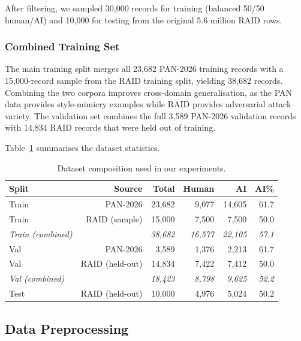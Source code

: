 After filtering, we sampled 30,000 records for training (balanced 50/50 human/AI) and 10,000 for testing from the original 5.6 million RAID rows.

\subsubsection{Combined Training Set}
The main training split merges all 23,682 PAN-2026 training records with a 15,000-record sample from the RAID training split, yielding 38,682 records. Combining the two corpora improves cross-domain generalisation, as the PAN data provides style-mimicry examples while RAID provides adversarial attack variety. The validation set combines the full 3,589 PAN-2026 validation records with 14,834 RAID records that were held out of training.

Table~\ref{tab:datasets} summarises the dataset statistics.

\begin{table}[htbp]
  \centering
  \caption{Dataset composition used in our experiments.}
  \label{tab:datasets}
  \setlength{\tabcolsep}{5pt}
  \begin{tabular}{lrrrrr}
    \toprule
    \textbf{Split} & \textbf{Source} & \textbf{Total} & \textbf{Human} & \textbf{AI} & \textbf{AI\%} \\
    \midrule
    Train & PAN-2026 & 23,682 & 9,077 & 14,605 & 61.7 \\
    Train & RAID (sample) & 15,000 & 7,500 & 7,500 & 50.0 \\
    \midrule
    \textit{Train (combined)} & & \textit{38,682} & \textit{16,577} & \textit{22,105} & \textit{57.1} \\
    \midrule
    Val & PAN-2026 & 3,589 & 1,376 & 2,213 & 61.7 \\
    Val & RAID (held-out) & 14,834 & 7,422 & 7,412 & 50.0 \\
    \midrule
    \textit{Val (combined)} & & \textit{18,423} & \textit{8,798} & \textit{9,625} & \textit{52.2} \\
    \midrule
    Test & RAID (held-out) & 10,000 & 4,976 & 5,024 & 50.2 \\
    \bottomrule
  \end{tabular}
\end{table}

\subsection{Data Preprocessing}

